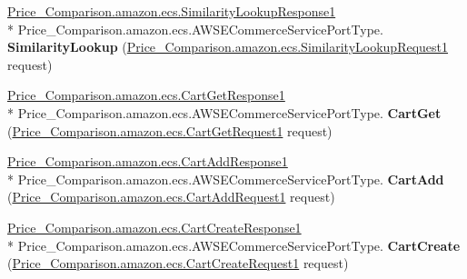 \begin{DoxyCompactItemize}
\item 
\hypertarget{class_price___comparison_1_1amazon_1_1ecs_1_1_a_w_s_e_commerce_service_port_type_client_a577b76d6cb33eb2c4bd517ef3e4c47f1}{\hyperlink{class_price___comparison_1_1amazon_1_1ecs_1_1_similarity_lookup_response1}{Price\-\_\-\-Comparison.\-amazon.\-ecs.\-Similarity\-Lookup\-Response1} \\*
Price\-\_\-\-Comparison.\-amazon.\-ecs.\-A\-W\-S\-E\-Commerce\-Service\-Port\-Type. {\bfseries Similarity\-Lookup} (\hyperlink{class_price___comparison_1_1amazon_1_1ecs_1_1_similarity_lookup_request1}{Price\-\_\-\-Comparison.\-amazon.\-ecs.\-Similarity\-Lookup\-Request1} request)}\label{class_price___comparison_1_1amazon_1_1ecs_1_1_a_w_s_e_commerce_service_port_type_client_a577b76d6cb33eb2c4bd517ef3e4c47f1}

\item 
\hypertarget{class_price___comparison_1_1amazon_1_1ecs_1_1_a_w_s_e_commerce_service_port_type_client_a9ed405b2d2d1012b6c4f77d92653b212}{\hyperlink{class_price___comparison_1_1amazon_1_1ecs_1_1_cart_get_response1}{Price\-\_\-\-Comparison.\-amazon.\-ecs.\-Cart\-Get\-Response1} \\*
Price\-\_\-\-Comparison.\-amazon.\-ecs.\-A\-W\-S\-E\-Commerce\-Service\-Port\-Type. {\bfseries Cart\-Get} (\hyperlink{class_price___comparison_1_1amazon_1_1ecs_1_1_cart_get_request1}{Price\-\_\-\-Comparison.\-amazon.\-ecs.\-Cart\-Get\-Request1} request)}\label{class_price___comparison_1_1amazon_1_1ecs_1_1_a_w_s_e_commerce_service_port_type_client_a9ed405b2d2d1012b6c4f77d92653b212}

\item 
\hypertarget{class_price___comparison_1_1amazon_1_1ecs_1_1_a_w_s_e_commerce_service_port_type_client_abbf3ec151628b15bbb4a8d8d52cf01b6}{\hyperlink{class_price___comparison_1_1amazon_1_1ecs_1_1_cart_add_response1}{Price\-\_\-\-Comparison.\-amazon.\-ecs.\-Cart\-Add\-Response1} \\*
Price\-\_\-\-Comparison.\-amazon.\-ecs.\-A\-W\-S\-E\-Commerce\-Service\-Port\-Type. {\bfseries Cart\-Add} (\hyperlink{class_price___comparison_1_1amazon_1_1ecs_1_1_cart_add_request1}{Price\-\_\-\-Comparison.\-amazon.\-ecs.\-Cart\-Add\-Request1} request)}\label{class_price___comparison_1_1amazon_1_1ecs_1_1_a_w_s_e_commerce_service_port_type_client_abbf3ec151628b15bbb4a8d8d52cf01b6}

\item 
\hypertarget{class_price___comparison_1_1amazon_1_1ecs_1_1_a_w_s_e_commerce_service_port_type_client_af3a0e65bfde114490fb9c71368b09c90}{\hyperlink{class_price___comparison_1_1amazon_1_1ecs_1_1_cart_create_response1}{Price\-\_\-\-Comparison.\-amazon.\-ecs.\-Cart\-Create\-Response1} \\*
Price\-\_\-\-Comparison.\-amazon.\-ecs.\-A\-W\-S\-E\-Commerce\-Service\-Port\-Type. {\bfseries Cart\-Create} (\hyperlink{class_price___comparison_1_1amazon_1_1ecs_1_1_cart_create_request1}{Price\-\_\-\-Comparison.\-amazon.\-ecs.\-Cart\-Create\-Request1} request)}\label{class_price___comparison_1_1amazon_1_1ecs_1_1_a_w_s_e_commerce_service_port_type_client_af3a0e65bfde114490fb9c71368b09c90}


\end{DoxyCompactItemize}
